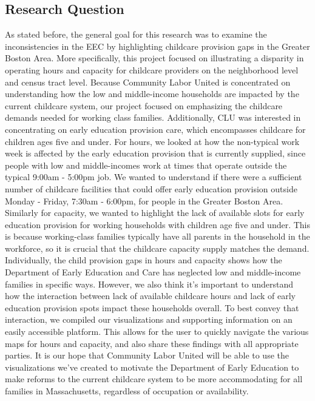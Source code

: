 \documentclass[10pt,letterpaper]{article}
\begin{document}
\subsection{Research Question}\label{research-question}

As stated before, the general goal for this research was to examine the
inconsistencies in the EEC by highlighting childcare provision gaps in
the Greater Boston Area. More specifically, this project focused on
illustrating a disparity in operating hours and capacity for childcare
providers on the neighborhood level and census tract level. Because
Community Labor United is concentrated on understanding how the low and
middle-income households are impacted by the current childcare system,
our project focused on emphasizing the childcare demands needed for
working class families. Additionally, CLU was interested in
concentrating on early education provision care, which encompasses
childcare for children ages five and under. For hours, we looked at how
the non-typical work week is affected by the early education provision
that is currently supplied, since people with low and middle-incomes
work at times that operate outside the typical 9:00am - 5:00pm job. We
wanted to understand if there were a sufficient number of childcare
facilities that could offer early education provision outside Monday -
Friday, 7:30am - 6:00pm, for people in the Greater Boston Area.
Similarly for capacity, we wanted to highlight the lack of available
slots for early education provision for working households with children
age five and under. This is because working-class families typically
have all parents in the household in the workforce, so it is crucial
that the childcare capacity supply matches the demand.\\
Individually, the child provision gaps in hours and capacity shows how
the Department of Early Education and Care has neglected low and
middle-income families in specific ways. However, we also think it's
important to understand how the interaction between lack of available
childcare hours and lack of early education provision spots impact these
households overall. To best convey that interaction, we compiled our
visualizations and supporting information on an easily accessible
platform. This allows for the user to quickly navigate the various maps
for hours and capacity, and also share these findings with all
appropriate parties. It is our hope that Community Labor United will be
able to use the visualizations we've created to motivate the Department
of Early Education to make reforms to the current childcare system to be
more accommodating for all families in Massachusetts, regardless of
occupation or availability.
\end{document}
